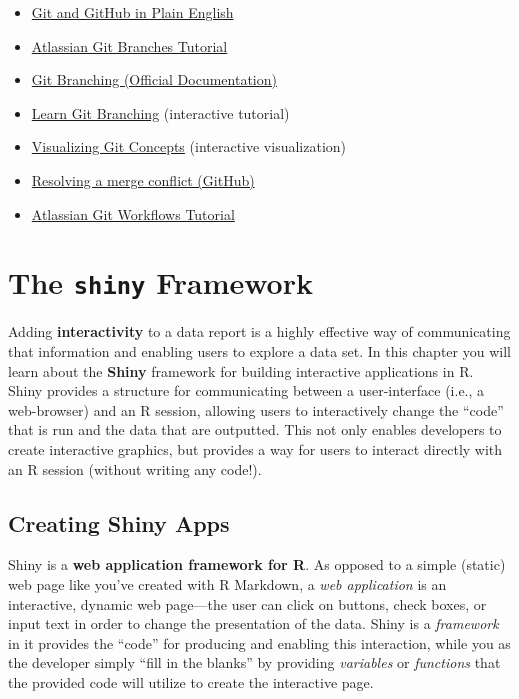\documentclass[]{book}
\providecommand{\tightlist}{%
  \setlength{\itemsep}{0pt}\setlength{\parskip}{0pt}}
\theoremstyle{definition}
\theoremstyle{definition}
\theoremstyle{remark}
\begin{document}
\begin{itemize}
\tightlist
\item
  \href{https://red-badger.com/blog/2016/11/29/gitgithub-in-plain-english}{Git
  and GitHub in Plain English}
\item
  \href{https://www.atlassian.com/git/tutorials/using-branches}{Atlassian
  Git Branches Tutorial}
\item
  \href{https://git-scm.com/book/en/v2/Git-Branching-Branches-in-a-Nutshell}{Git
  Branching (Official Documentation)}
\item
  \href{http://learngitbranching.js.org/}{Learn Git Branching}
  (interactive tutorial)
\item
  \href{http://www.wei-wang.com/ExplainGitWithD3/\#}{Visualizing Git
  Concepts} (interactive visualization)
\item
  \href{https://help.github.com/articles/resolving-a-merge-conflict-using-the-command-line/}{Resolving
  a merge conflict (GitHub)}
\item
  \href{https://www.atlassian.com/git/tutorials/comparing-workflows}{Atlassian
  Git Workflows Tutorial}
\end{itemize}

\chapter{\texorpdfstring{The \texttt{shiny}
Framework}{The shiny Framework}}\label{shiny}

Adding \textbf{interactivity} to a data report is a highly effective way
of communicating that information and enabling users to explore a data
set. In this chapter you will learn about the \textbf{Shiny} framework
for building interactive applications in R. Shiny provides a structure
for communicating between a user-interface (i.e., a web-browser) and an
R session, allowing users to interactively change the ``code'' that is
run and the data that are outputted. This not only enables developers to
create interactive graphics, but provides a way for users to interact
directly with an R session (without writing any code!).

\section{Creating Shiny Apps}\label{creating-shiny-apps}

Shiny is a \textbf{web application framework for R}. As opposed to a
simple (static) web page like you've created with R Markdown, a
\emph{web application} is an interactive, dynamic web page---the user
can click on buttons, check boxes, or input text in order to change the
presentation of the data. Shiny is a \emph{framework} in it provides the
``code'' for producing and enabling this interaction, while you as the
developer simply ``fill in the blanks'' by providing \emph{variables} or
\emph{functions} that the provided code will utilize to create the
interactive page.
\end{document}
